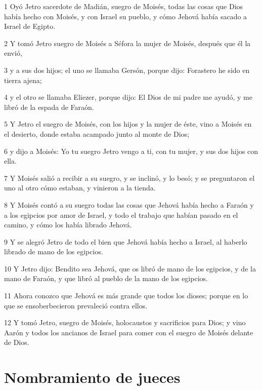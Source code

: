 \par 1 Oyó Jetro sacerdote de Madián, suegro de Moisés, todas las cosas que Dios había hecho con Moisés, y con Israel su pueblo, y cómo Jehová había sacado a Israel de Egipto.
\par 2 Y tomó Jetro suegro de Moisés a Séfora la mujer de Moisés, después que él la envió,
\par 3 y a sus dos hijos; el uno se llamaba Gersón, porque dijo: Forastero he sido en tierra ajena;
\par 4 y el otro se llamaba Eliezer, porque dijo: El Dios de mi padre me ayudó, y me libró de la espada de Faraón.
\par 5 Y Jetro el suegro de Moisés, con los hijos y la mujer de éste, vino a Moisés en el desierto, donde estaba acampado junto al monte de Dios;
\par 6 y dijo a Moisés: Yo tu suegro Jetro vengo a ti, con tu mujer, y sus dos hijos con ella.
\par 7 Y Moisés salió a recibir a su suegro, y se inclinó, y lo besó; y se preguntaron el uno al otro cómo estaban, y vinieron a la tienda.
\par 8 Y Moisés contó a su suegro todas las cosas que Jehová había hecho a Faraón y a los egipcios por amor de Israel, y todo el trabajo que habían pasado en el camino, y cómo los había librado Jehová.
\par 9 Y se alegró Jetro de todo el bien que Jehová había hecho a Israel, al haberlo librado de mano de los egipcios.
\par 10 Y Jetro dijo: Bendito sea Jehová, que os libró de mano de los egipcios, y de la mano de Faraón, y que libró al pueblo de la mano de los egipcios.
\par 11 Ahora conozco que Jehová es más grande que todos los dioses; porque en lo que se ensoberbecieron prevaleció contra ellos.
\par 12 Y tomó Jetro, suegro de Moisés, holocaustos y sacrificios para Dios; y vino Aarón y todos los ancianos de Israel para comer con el suegro de Moisés delante de Dios.

\section*{Nombramiento de jueces}

